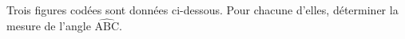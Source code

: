 
Trois figures codées sont données ci-dessous. Pour chacune d'elles, déterminer la mesure de l'angle 
$\widehat{\text{ABC}}$.

\bigskip


